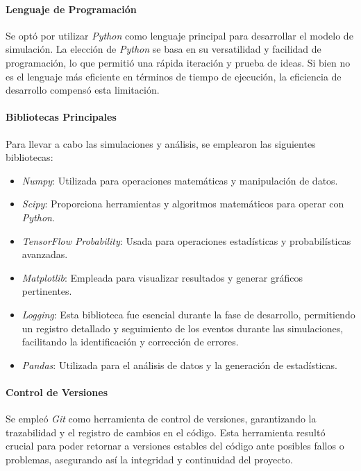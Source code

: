 \paragraph{Lenguaje de Programación}
Se optó por utilizar \textit{Python} como lenguaje principal para desarrollar el modelo de simulación. La elección de \textit{Python} se basa en su versatilidad y facilidad de programación, lo que permitió una rápida iteración y prueba de ideas. Si bien no es el lenguaje más eficiente en términos de tiempo de ejecución, la eficiencia de desarrollo compensó esta limitación.

\paragraph{Bibliotecas Principales}
Para llevar a cabo las simulaciones y análisis, se emplearon las siguientes bibliotecas:
\begin{itemize}
    \item \textit{Numpy}: Utilizada para operaciones matemáticas y manipulación de datos.
    \item \textit{Scipy}: Proporciona herramientas y algoritmos matemáticos para operar con \textit{Python}.
    \item \textit{TensorFlow Probability}: Usada para operaciones estadísticas y probabilísticas avanzadas.
    \item \textit{Matplotlib}: Empleada para visualizar resultados y generar gráficos pertinentes.
    \item \textit{Logging}: Esta biblioteca fue esencial durante la fase de desarrollo, permitiendo un registro detallado y seguimiento de los eventos durante las simulaciones, facilitando la identificación y corrección de errores.
    \item \textit{Pandas}: Utilizada para el análisis de datos y la generación de estadísticas.
\end{itemize}

\paragraph{Control de Versiones}
Se empleó \textit{Git} como herramienta de control de versiones, garantizando la trazabilidad y el registro de cambios en el código. Esta herramienta resultó crucial para poder retornar a versiones estables del código ante posibles fallos o problemas, asegurando así la integridad y continuidad del proyecto.

